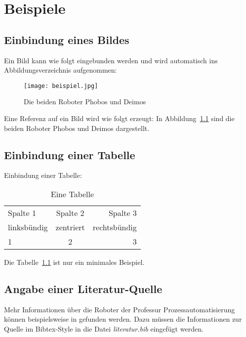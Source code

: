 \chapter{Beispiele}
\section{Einbindung eines Bildes}
Ein Bild kann wie folgt eingebunden werden und wird automatisch ins Abbildungsverzeichnis aufgenommen:

\begin{figure}[htb]
  \centering
  \texttt{[image: beispiel.jpg]}
  \caption{Die beiden Roboter Phobos und Deimos}
  \label{fig:roboter}
\end{figure}

Eine Referenz auf ein Bild wird wie folgt erzeugt: In Abbildung~\ref{fig:roboter} sind die beiden Roboter Phobos und Deimos dargestellt.

\section{Einbindung einer Tabelle}
Einbindung einer Tabelle:

\begin{table}[htb]
  \centering
  \begin{tabular}{l|c|r}
    Spalte 1 		& Spalte 2 	& Spalte 3 	\\
    linksbündig 	& zentriert 	& rechtsbündig 	\\
    1			& 2		& 3		\\
  \end{tabular}
  \caption{Eine Tabelle}
  \label{tab:table1}
\end{table}

Die Tabelle~\ref{tab:table1} ist nur ein minimales Beispiel.

\section{Angabe einer Literatur-Quelle}
Mehr Informationen über die Roboter der Professur Prozessautomatisierung können beispielsweise in \citep{robots} gefunden werden. Dazu müssen die Informationen zur Quelle im Bibtex-Style in die Datei \textit{literatur.bib} eingefügt werden.



